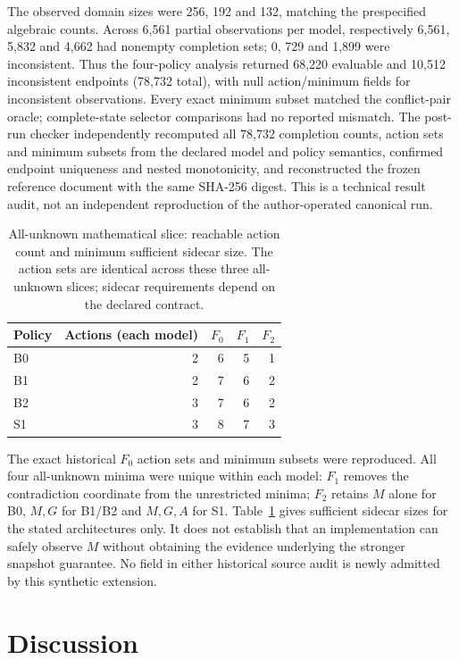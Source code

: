 \documentclass[preprint,12pt]{elsarticle}
\begin{document}
The observed domain sizes were 256, 192 and 132, matching the prespecified algebraic counts. Across 6,561 partial observations per model, respectively 6,561, 5,832 and 4,662 had nonempty completion sets; 0, 729 and 1,899 were inconsistent. Thus the four-policy analysis returned 68,220 evaluable and 10,512 inconsistent endpoints (78,732 total), with null action/minimum fields for inconsistent observations. Every exact minimum subset matched the conflict-pair oracle; complete-state selector comparisons had no reported mismatch. The post-run checker independently recomputed all 78,732 completion counts, action sets and minimum subsets from the declared model and policy semantics, confirmed endpoint uniqueness and nested monotonicity, and reconstructed the frozen reference document with the same SHA-256 digest. This is a technical result audit, not an independent reproduction of the author-operated canonical run.

\begin{table}[H]
\centering
\small
\caption{All-unknown mathematical slice: reachable action count and minimum sufficient sidecar size. The action sets are identical across these three all-unknown slices; sidecar requirements depend on the declared contract.}
\label{tab:extensionsidecar}
\begin{tabular}{lrrrr}
\toprule
Policy & Actions (each model) & $F_0$ & $F_1$ & $F_2$ \\
\midrule
B0 & 2 & 6 & 5 & 1 \\
B1 & 2 & 7 & 6 & 2 \\
B2 & 3 & 7 & 6 & 2 \\
S1 & 3 & 8 & 7 & 3 \\
\bottomrule
\end{tabular}
\end{table}

The exact historical $F_0$ action sets and minimum subsets were reproduced. All four all-unknown minima were unique within each model: $F_1$ removes the contradiction coordinate from the unrestricted minima; $F_2$ retains $M$ alone for B0, $M,G$ for B1/B2 and $M,G,A$ for S1. Table~\ref{tab:extensionsidecar} gives sufficient sidecar sizes for the stated architectures only. It does not establish that an implementation can safely observe $M$ without obtaining the evidence underlying the stronger snapshot guarantee. No field in either historical source audit is newly admitted by this synthetic extension.

\section{Discussion}
\end{document}
